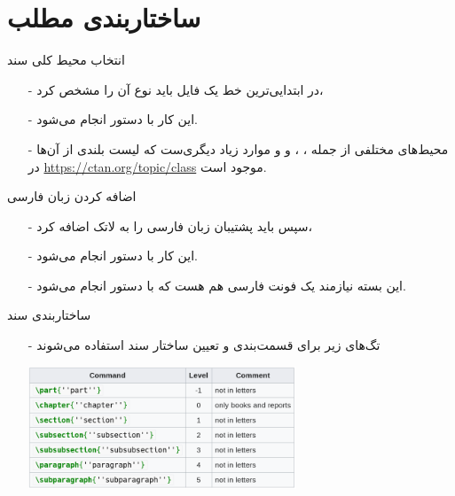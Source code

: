 \section{ساختاربندی مطلب}
\begin{frame}{انتخاب محیط کلی سند}
\begin{itemize}\itemr
\item[-] 
در ابتدایی‌ترین خط یک فایل 
باید نوع آن را مشخص کرد،

\item[-]
این کار با دستور 
انجام می‌شود.

\item[-]
محیط‌های مختلفی از جمله
،
،
 و
و موارد زیاد دیگری‌ست که لیست بلندی از آن‌ها در 
\url{https://ctan.org/topic/class}
موجود است.
\end{itemize}
\end{frame}

\begin{frame}{اضافه کردن زبان فارسی}
\begin{itemize}\itemr
\item[-] 
سپس باید پشتیبان زبان فارسی را به لاتک اضافه کرد،

\item[-]
این کار با دستور 
انجام می‌شود.

\item[-]
این بسته نیازمند یک فونت فارسی هم هست که با دستور 
انجام می‌شود.
\end{itemize}
\end{frame}

\begin{frame}{ساختاربندی سند}\label{parts-chapters}
\begin{itemize}\itemr
\item[-]
تگ‌های زیر برای قسمت‌بندی و تعیین ساختار سند استفاده می‌شوند

\begin{center}
\includegraphics[width=0.63\textwidth, height=0.53\textheight]{docs/images/sections} 
\end{center}
\end{itemize}
\end{frame}

